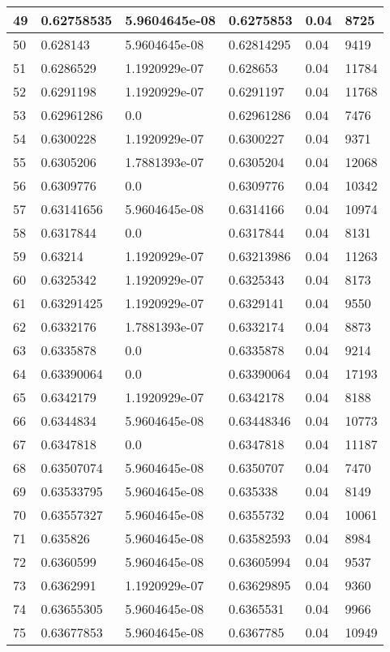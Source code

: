 \begin{longtable}{|l|l|l|l|l|l|}
49 & 0.62758535 & 5.9604645e-08 & 0.6275853 & 0.04 & 8725 \\ \hline 
50 & 0.628143 & 5.9604645e-08 & 0.62814295 & 0.04 & 9419 \\ \hline 
51 & 0.6286529 & 1.1920929e-07 & 0.628653 & 0.04 & 11784 \\ \hline 
52 & 0.6291198 & 1.1920929e-07 & 0.6291197 & 0.04 & 11768 \\ \hline 
53 & 0.62961286 & 0.0 & 0.62961286 & 0.04 & 7476 \\ \hline 
54 & 0.6300228 & 1.1920929e-07 & 0.6300227 & 0.04 & 9371 \\ \hline 
55 & 0.6305206 & 1.7881393e-07 & 0.6305204 & 0.04 & 12068 \\ \hline 
56 & 0.6309776 & 0.0 & 0.6309776 & 0.04 & 10342 \\ \hline 
57 & 0.63141656 & 5.9604645e-08 & 0.6314166 & 0.04 & 10974 \\ \hline 
58 & 0.6317844 & 0.0 & 0.6317844 & 0.04 & 8131 \\ \hline 
59 & 0.63214 & 1.1920929e-07 & 0.63213986 & 0.04 & 11263 \\ \hline 
60 & 0.6325342 & 1.1920929e-07 & 0.6325343 & 0.04 & 8173 \\ \hline 
61 & 0.63291425 & 1.1920929e-07 & 0.6329141 & 0.04 & 9550 \\ \hline 
62 & 0.6332176 & 1.7881393e-07 & 0.6332174 & 0.04 & 8873 \\ \hline 
63 & 0.6335878 & 0.0 & 0.6335878 & 0.04 & 9214 \\ \hline 
64 & 0.63390064 & 0.0 & 0.63390064 & 0.04 & 17193 \\ \hline 
65 & 0.6342179 & 1.1920929e-07 & 0.6342178 & 0.04 & 8188 \\ \hline 
66 & 0.6344834 & 5.9604645e-08 & 0.63448346 & 0.04 & 10773 \\ \hline 
67 & 0.6347818 & 0.0 & 0.6347818 & 0.04 & 11187 \\ \hline 
68 & 0.63507074 & 5.9604645e-08 & 0.6350707 & 0.04 & 7470 \\ \hline 
69 & 0.63533795 & 5.9604645e-08 & 0.635338 & 0.04 & 8149 \\ \hline 
70 & 0.63557327 & 5.9604645e-08 & 0.6355732 & 0.04 & 10061 \\ \hline 
71 & 0.635826 & 5.9604645e-08 & 0.63582593 & 0.04 & 8984 \\ \hline 
72 & 0.6360599 & 5.9604645e-08 & 0.63605994 & 0.04 & 9537 \\ \hline 
73 & 0.6362991 & 1.1920929e-07 & 0.63629895 & 0.04 & 9360 \\ \hline 
74 & 0.63655305 & 5.9604645e-08 & 0.6365531 & 0.04 & 9966 \\ \hline 
75 & 0.63677853 & 5.9604645e-08 & 0.6367785 & 0.04 & 10949 \\ \hline 
\end{longtable}